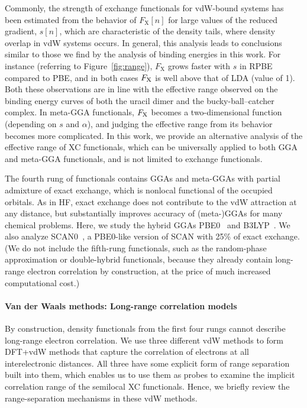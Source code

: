 Commonly, the strength of exchange functionals for vdW-bound systems has been estimated from the behavior of $F_\text{X}[n]$ for large values of the reduced gradient, $s[n]$, which are characteristic of the density tails, where density overlap in vdW systems occurs.
In general, this analysis leads to conclusions similar to those we find by the analysis of binding energies in this work.
For instance (referring to Figure~\ref{fig:range}), $F_\text{X}$ grows faster with $s$ in RPBE compared to PBE, and in both cases $F_\text X$ is well above that of LDA (value of 1).
Both these observations are in line with the effective range observed on the binding energy curves of both the uracil dimer and the bucky-ball--catcher complex.
In meta-GGA functionals, $F_\text X$ becomes a two-dimensional function (depending on $s$ and $\alpha$), and judging the effective range from its behavior becomes more complicated.
In this work, we provide an alternative analysis of the effective range of XC functionals, which can be universally applied to both GGA and meta-GGA functionals, and is not limited to exchange functionals.

The fourth rung of functionals contains GGAs and meta-GGAs with partial admixture of exact exchange, which is nonlocal functional of the occupied orbitals.
As in HF, exact exchange does not contribute to the vdW attraction at any distance, but substantially improves accuracy of (meta-)GGAs for many chemical problems. %
Here, we study the hybrid GGAs PBE0~\cite{PerdewJCP96,AdamoJCP99} and B3LYP~\cite{BeckeJCP93}.
We also analyze SCAN0~\cite{HuiJCP16}, a PBE0-like version of SCAN with 25\% of exact exchange.
(We do not include the fifth-rung functionals, such as the random-phase approximation or double-hybrid functionals, because they already contain long-range electron correlation by construction, at the price of much increased computational cost.)

\paragraph{Van der Waals methods: Long-range correlation models}

By construction, density functionals from the first four rungs cannot describe long-range electron correlation.
We use three different vdW methods to form DFT+vdW methods that capture the correlation of electrons at all interelectronic distances.
All three have some explicit form of range separation built into them, which enables us to use them as probes to examine the implicit correlation range of the semilocal XC functionals.
Hence, we briefly review the range-separation mechanisms in these vdW methods.

